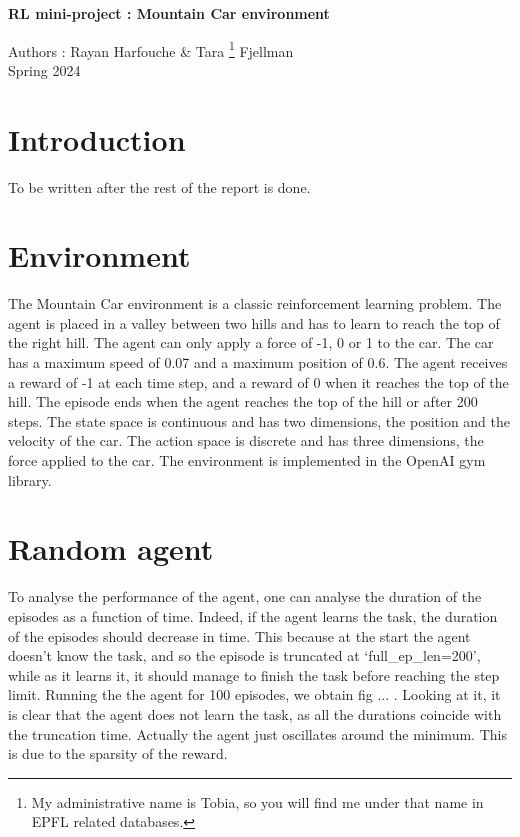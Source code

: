 \documentclass[a4paper, 12pt,oneside]{article}
\begin{document}
 
	\begin{center}
	    \Large
	    \textbf{RL mini-project : Mountain Car environment}
	        
	    \vspace{0.4cm}
	    \large
	    Authors : Rayan Harfouche \& Tara \footnote[1]{My administrative name is Tobia, so you will find me under that name in EPFL related databases.} Fjellman \\
	    \small{Spring 2024}
	\end{center}

    \section{Introduction}
        To be written after the rest of the report is done.

    \section{Environment}
        The Mountain Car environment is a classic reinforcement learning problem. The agent is placed in a valley between two hills and has to learn to reach the top of the right hill. The agent can only apply a force of -1, 0 or 1 to the car. The car has a maximum speed of 0.07 and a maximum position of 0.6. The agent receives a reward of -1 at each time step, and a reward of 0 when it reaches the top of the hill. The episode ends when the agent reaches the top of the hill or after 200 steps. The state space is continuous and has two dimensions, the position and the velocity of the car. The action space is discrete and has three dimensions, the force applied to the car. The environment is implemented in the OpenAI gym library.
    \section{Random agent}
    To analyse the performance of the agent, one can analyse the duration of the episodes as a function of time. Indeed, if the agent learns the task, the duration of the episodes should decrease in time. This because at the start the agent doesn't know the task, and so the episode is truncated at `full\_ep\_len=200', while as it learns it, it should manage to finish the task before reaching the step limit. 
    Running the the agent for 100 episodes, we obtain fig ... . Looking at it, it is clear that the agent does not learn the task, as all the durations coincide with the truncation time. Actually the agent just oscillates around the minimum. This is due to the sparsity of the reward. 
\end{document}
